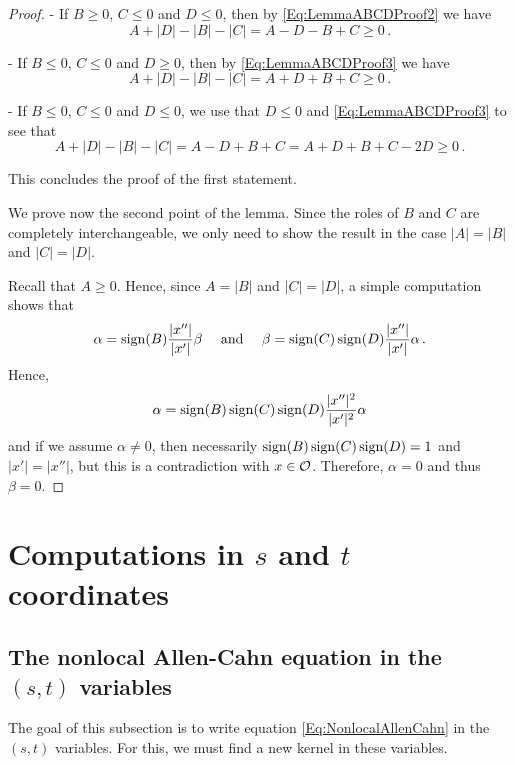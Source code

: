 \begin{proof}
- If $B \geq 0$, $C \leq 0$ and $D \leq 0$, then by \eqref{Eq:LemmaABCDProof2} we have
$$
A + |D| - |B| - |C| = A - D - B + C \geq 0\,.
$$

- If $B \leq 0$, $C \leq 0$ and $D \geq 0$, then by \eqref{Eq:LemmaABCDProof3} we have
$$
A + |D| - |B| - |C| = A + D + B + C \geq 0\,.
$$

- If $B \leq 0$, $C \leq 0$ and $D \leq 0$, we use that $D\leq 0$ and \eqref{Eq:LemmaABCDProof3} to
see that
$$
A + |D| - |B| - |C| = A - D + B + C =  A + D + B + C -2D \geq 0\,.
$$

This concludes the proof of the first statement.

We prove now the second point of the lemma. Since the roles of $B$ and $C$ are completely
interchangeable, we only need to show the result in the case $|A| = |B|$ and $|C| = |D|$.

Recall that $A \geq 0$. Hence, since $A = |B|$ and $|C| = |D|$, a simple computation shows that
$$
\alpha = \operatorname{sign} (B) \dfrac{|x''|}{|x'|}\beta \quad \textrm{ and } \quad
\beta = \operatorname{sign} (C) \operatorname{sign}(D) \dfrac{|x''|}{|x'|} \alpha \,.
$$
Hence,
$$
\alpha = \operatorname{sign} (B) \operatorname{sign} (C) \operatorname{sign}(D) \dfrac{|x''|^2}{|x'|^2} \alpha
$$
and if we assume $\alpha \neq 0$, then necessarily $\operatorname{sign} (B) \operatorname{sign} (C) \operatorname{sign}(D)=1$ and $|x'| =
|x''|$, but this is a contradiction with $x\in \mathcal{O}$. Therefore, $\alpha = 0$ and thus $\beta =
0$.
\end{proof}








\section{Computations in $s$ and $t$ coordinates}
\label{Sec:stcomputations}


\subsection{The nonlocal Allen-Cahn equation in the $(s,t)$ variables}

The goal of this subsection is to write equation \eqref{Eq:NonlocalAllenCahn} in the $(s,t)$
variables. For this, we must find a new kernel in these variables.

